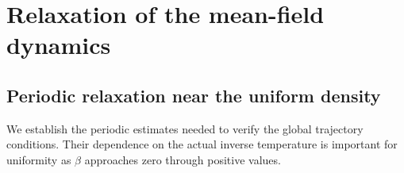 \documentclass[11pt,reqno]{amsart}
\numberwithin{equation}{section}
\theoremstyle{definition}
\theoremstyle{remark}
\newcommand{\revision}[1]{{\ifdefined\MarkedRevision\color{red}\fi#1}}
\begin{document}
\section{Relaxation of the mean-field dynamics}\label{sec:relaxation}

\subsection{\texorpdfstring{\revision{Periodic relaxation near the uniform density}}{Periodic relaxation near the uniform density}}\label{subsec:periodic-relaxation}

We establish the periodic estimates needed to verify the global trajectory conditions. Their dependence on the actual inverse temperature is important for uniformity as $\beta$ approaches zero through positive values.
\end{document}
